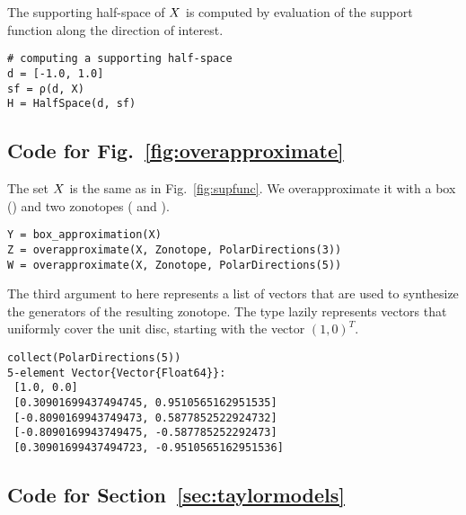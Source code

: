 The supporting half-space of $X$ is computed by evaluation of the support function along the direction of interest.

\begin{minipage}{\linewidth}
\vspace{-\abovedisplayskip}
\begin{lstlisting}
# computing a supporting half-space
d = [-1.0, 1.0]
sf = ρ(d, X)
H = HalfSpace(d, sf)
\end{lstlisting}
\end{minipage}


\subsection{Code for Fig.~\ref{fig:overapproximate}}

The set $X$ is the same as in Fig.~\ref{fig:supfunc}.
We overapproximate it with a box () and two zonotopes ( and ).

\begin{minipage}{\linewidth}
\vspace{-\abovedisplayskip}
\begin{lstlisting}
Y = box_approximation(X)
Z = overapproximate(X, Zonotope, PolarDirections(3))
W = overapproximate(X, Zonotope, PolarDirections(5))
\end{lstlisting}
\end{minipage}

The third argument to  here represents a list of vectors that are used to synthesize the generators of the resulting zonotope.
The type  lazily represents vectors that uniformly cover the unit disc, starting with the vector $(1, 0)^T$.

\begin{minipage}{\linewidth}
\vspace{-\abovedisplayskip}
\begin{lstlisting}
collect(PolarDirections(5))
5-element Vector{Vector{Float64}}:
 [1.0, 0.0]
 [0.30901699437494745, 0.9510565162951535]
 [-0.8090169943749473, 0.5877852522924732]
 [-0.8090169943749475, -0.587785252292473]
 [0.30901699437494723, -0.9510565162951536]
\end{lstlisting}
\end{minipage}

\subsection{Code for Section~\ref{sec:taylormodels}} \label{sec:taylormodels_appendix}

